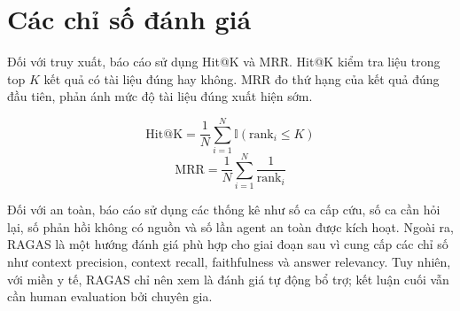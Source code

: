 \section{Các chỉ số đánh giá}

Đối với truy xuất, báo cáo sử dụng Hit@K và MRR. Hit@K kiểm tra liệu trong top \(K\) kết quả có tài liệu đúng hay không. MRR đo thứ hạng của kết quả đúng đầu tiên, phản ánh mức độ tài liệu đúng xuất hiện sớm.

\begin{formulabox}
\[
\mathrm{Hit@K}=\frac{1}{N}\sum_{i=1}^{N}\mathbb{I}(\mathrm{rank}_i\le K)
\]
\[
\mathrm{MRR}=\frac{1}{N}\sum_{i=1}^{N}\frac{1}{\mathrm{rank}_i}
\]
\end{formulabox}

Đối với an toàn, báo cáo sử dụng các thống kê như số ca cấp cứu, số ca cần hỏi lại, số phản hồi không có nguồn và số lần agent an toàn được kích hoạt. Ngoài ra, RAGAS là một hướng đánh giá phù hợp cho giai đoạn sau vì cung cấp các chỉ số như context precision, context recall, faithfulness và answer relevancy. Tuy nhiên, với miền y tế, RAGAS chỉ nên xem là đánh giá tự động bổ trợ; kết luận cuối vẫn cần human evaluation bởi chuyên gia.
